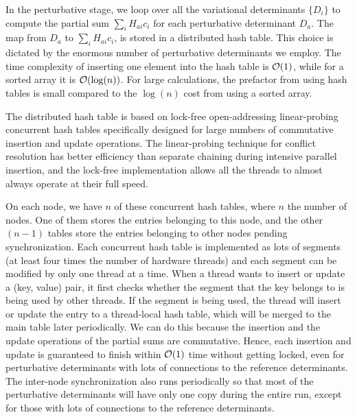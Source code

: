 \documentclass[%
reprint,
 superscriptaddress,
 amsmath,amssymb,
 aps,
]{revtex4-1}
\begin{document}
In the perturbative stage, we loop over all the variational determinants $\{D_i\}$ to compute the partial sum $\sum_i H_{ai}c_{i}$
for each perturbative determinant $D_a$.
The map from $D_a$ to $\sum_i H_{ai}c_{i}$, is stored in a distributed hash table.
This choice is dictated by the enormous number of perturbative determinants we employ.
The time complexity of inserting one element into the hash table is ${\cal O}(1)$, while for a sorted array it is ${\cal O}(\log(n))$.
For large calculations, the prefactor from using hash tables is small compared to the $\log(n)$ cost from using a sorted array.

The distributed hash table is based on lock-free open-addressing linear-probing concurrent hash tables specifically designed
for large numbers of commutative insertion and update operations.
The linear-probing technique for conflict resolution has better efficiency than separate chaining during intensive parallel insertion,
and the lock-free implementation allows all the threads to almost always operate at their full speed.

On each node, we have $n$ of these concurrent hash tables, where $n$ the number of nodes.
One of them stores the entries belonging to this node, and the other $(n-1)$ tables store the entries belonging to other nodes pending synchronization.
Each concurrent hash table is implemented as lots of segments (at least four times the number of hardware threads) and each segment can be modified by only one thread at a time.
When a thread wants to insert or update a (key, value) pair, it first checks whether the segment that the key belongs to is being used by other threads.
If the segment is being used, the thread will insert or update the entry to a thread-local hash table, which will be merged to the main table later periodically.
We can do this because the insertion and the update operations of the partial sums are commutative.
Hence, each insertion and update is guaranteed to finish within ${\cal O}(1)$ time without getting locked, even for perturbative determinants with lots of connections to the reference determinants.
The inter-node synchronization also runs periodically so that most of the perturbative determinants will have only one copy during the entire run, except for those with lots of connections to the reference determinants.
\end{document}
